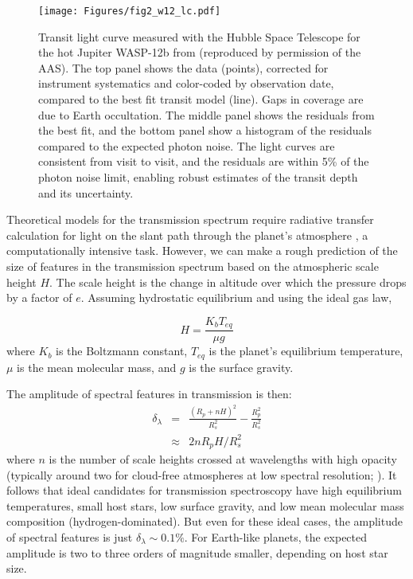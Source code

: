 \documentclass[graybox,natbib,nosecnum]{svmult}
\begin{document}
\begin{figure}
\begin{centering}
\texttt{[image: Figures/fig2\_w12\_lc.pdf]}
\caption{Transit light curve measured with the Hubble Space Telescope for the hot Jupiter WASP-12b from \citealt{kreidberg15b} (reproduced by permission of the AAS). The top panel shows the data (points), corrected for instrument systematics and color-coded by observation date, compared to the best fit transit model (line). Gaps in coverage are due to Earth occultation. The middle panel shows the residuals from the best fit, and the bottom panel show a histogram of the residuals compared to the expected photon noise. The light curves are consistent from visit to visit, and the residuals are within 5\% of the photon noise limit, enabling robust estimates of the transit depth and its uncertainty.}
\label{fig:lc}       
\end{centering}
\end{figure}

Theoretical models for the transmission spectrum require radiative transfer calculation for light on the slant path through the planet's atmosphere \citep{seager00}, a computationally intensive task. However, we can make a rough prediction of the size of features in the transmission spectrum based on the atmospheric scale height $H$. The scale height is the change in altitude over which the pressure drops by a factor of $e$. Assuming hydrostatic equilibrium and using the ideal gas law,

\begin{equation}
H = \frac{K_bT_{eq}}{\mu g}
\end{equation}
where $K_b$ is the Boltzmann constant, $T_{eq}$ is the planet's equilibrium temperature, $\mu$ is the mean molecular mass, and $g$ is the surface gravity.

The amplitude of spectral features in transmission is then:
\begin{eqnarray}
\delta_\lambda &=& \frac{(R_p + nH)^2}{R_s^2} - \frac{R_p^2}{R_s^2}\\
 & \approx & 2nR_pH/R_s^2
\end{eqnarray} 
where $n$ is the number of scale heights crossed at wavelengths with high opacity (typically around two for cloud-free atmospheres at low spectral resolution; \citealt{stevenson16}). It follows that ideal candidates for transmission spectroscopy have high equilibrium temperatures, small host stars, low surface gravity, and low mean molecular mass composition (hydrogen-dominated). But even for these ideal cases, the amplitude of spectral features is just $\delta_\lambda \sim0.1\%$. For Earth-like planets, the expected amplitude is two to three orders of magnitude smaller, depending on host star size. 
\end{document}
